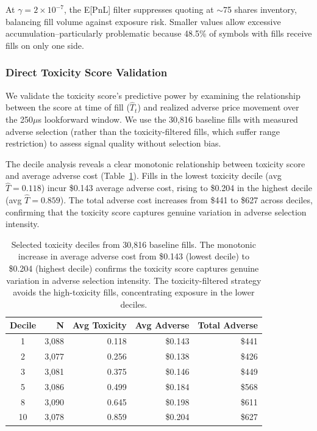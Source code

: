 \documentclass[11pt]{article}
\theoremstyle{definition}
\begin{document}
At $\gamma = 2 \times 10^{-7}$, the E[PnL] filter suppresses quoting at $\sim$75 shares inventory, balancing fill volume against exposure risk. Smaller values allow excessive accumulation--particularly problematic because 48.5\% of symbols with fills receive fills on only one side.

\subsubsection{Direct Toxicity Score Validation}

We validate the toxicity score's predictive power by examining the relationship between the score at time of fill ($\hat{T}_t$) and realized adverse price movement over the 250$\mu$s lookforward window. We use the 30,816 baseline fills with measured adverse selection (rather than the toxicity-filtered fills, which suffer range restriction) to assess signal quality without selection bias.

The decile analysis reveals a clear monotonic relationship between toxicity score and average adverse cost (Table~\ref{tab:deciles}). Fills in the lowest toxicity decile (avg $\hat{T} = 0.118$) incur \$0.143 average adverse cost, rising to \$0.204 in the highest decile (avg $\hat{T} = 0.859$). The total adverse cost increases from \$441 to \$627 across deciles, confirming that the toxicity score captures genuine variation in adverse selection intensity.

\begin{table}[H]
\centering
\begin{tabular}{crrrr}
\toprule
\textbf{Decile} & \textbf{N} & \textbf{Avg Toxicity} & \textbf{Avg Adverse} & \textbf{Total Adverse} \\
\midrule
1 & 3,088 & 0.118 & \$0.143 & \$441 \\
2 & 3,077 & 0.256 & \$0.138 & \$426 \\
3 & 3,081 & 0.375 & \$0.146 & \$449 \\
5 & 3,086 & 0.499 & \$0.184 & \$568 \\
8 & 3,090 & 0.645 & \$0.198 & \$611 \\
10 & 3,078 & 0.859 & \$0.204 & \$627 \\
\bottomrule
\end{tabular}
\caption{Selected toxicity deciles from 30,816 baseline fills. The monotonic increase in average adverse cost from \$0.143 (lowest decile) to \$0.204 (highest decile) confirms the toxicity score captures genuine variation in adverse selection intensity. The toxicity-filtered strategy avoids the high-toxicity fills, concentrating exposure in the lower deciles.}
\label{tab:deciles}
\end{table}
\end{document}
